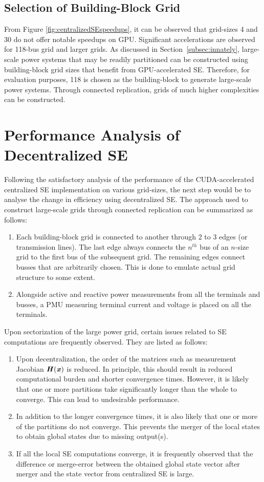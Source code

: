 \documentclass[thesis.tex]{subfiles}
\begin{document}
\subsection{Selection of Building-Block Grid }
From Figure \ref{fig:centralizedSEspeedups}, it can be observed that grid-sizes 4 and 30 do not offer notable speedups on GPU. Significant accelerations are observed for 118-bus grid and larger grids. As discussed in Section~\ref{subsec:innately}, large-scale power systems that may be readily partitioned can be constructed using building-block grid sizes that benefit from GPU-accelerated SE. 
Therefore, for evaluation purposes, 118 is chosen as the building-block to generate large-scale power systems. Through connected replication, grids of much higher complexities can be constructed.

\section{Performance Analysis of Decentralized SE}\label{sec:decPerf}
Following the satisfactory analysis of the performance of the CUDA-accelerated centralized SE implementation on various grid-sizes, the next step would be to analyse the change in efficiency using decentralized SE. The approach used to construct large-scale grids through connected replication can be summarized as follows:
\begin{enumerate}
	\item Each building-block grid is connected to another through 2 to 3 edges (or transmission lines). The last edge always connects the $n^{th}$ bus of an $n$-size grid to the first bus of the subsequent grid. The remaining edges connect busses that are arbitrarily chosen. This is done to emulate actual grid structure to some extent.
	\item Alongside active and reactive power measurements from all the terminals and busses, a PMU measuring terminal current and voltage is placed on all the terminals. 
\end{enumerate}

Upon sectorization of the large power grid, certain issues related to SE computations are frequently observed. They are listed as follows:
\begin{enumerate}
	\item Upon decentralization, the order of the matrices such as measurement Jacobian $\textbf{\textit{H}}(\textbf{\textit{x}})$ is reduced. In principle, this should result in reduced computational burden and shorter convergence times. However, it is likely that one or more partitions take significantly longer than the whole to converge. This can lead to undesirable performance. 
	\item In addition to the longer convergence times, it is also likely that one or more of the partitions do not converge. This prevents the merger of the local states to obtain global states due to missing output(s).
	\item If all the local SE computations converge, it is frequently observed that the difference or merge-error between the obtained global state vector after merger and the state vector from centralized SE is large. 
\end{enumerate}
\end{document}
